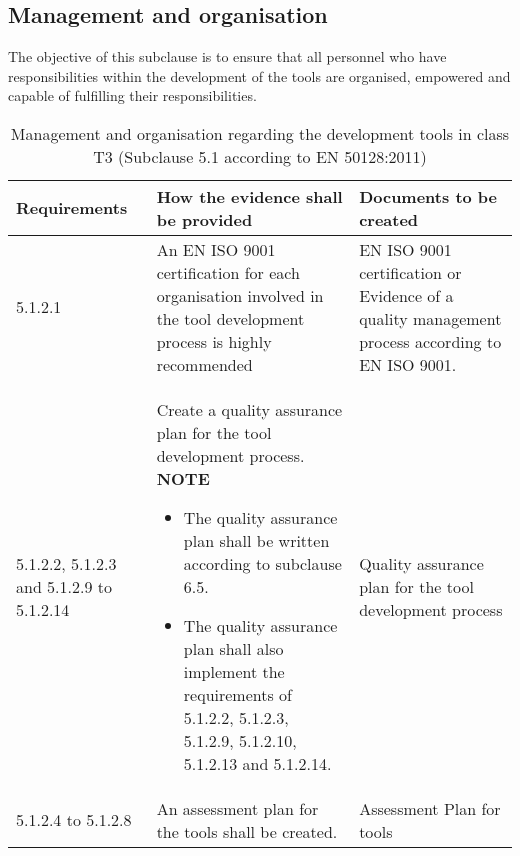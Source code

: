 \documentclass{template/openetcs_report}
\begin{document}
\subsection{Management and organisation}
The objective of this subclause is to ensure that all personnel who have responsibilities within the development of the tools are organised, empowered and capable of fulfilling their responsibilities.
{\footnotesize\sffamily\centering
\begin{longtable}{|p{2cm}|p{9cm}|p{3cm}|}
\caption{Management and organisation regarding the development tools in class T3 (Subclause 5.1 according to EN 50128:2011)}\\
\hline
\bfseries Requirements & \bfseries How the evidence shall be provided & \bfseries Documents to be created\\
\hline
\hline
\endhead
\hline
\endfoot

5.1.2.1 & An EN ISO 9001 certification for each organisation involved in the tool development process is highly recommended & EN ISO 9001 certification or Evidence of a quality management process according to EN ISO 9001.\\ 
\hline
5.1.2.2, 5.1.2.3 and 5.1.2.9 to 5.1.2.14 & Create a quality assurance plan for the tool development process. 
\linebreak
\linebreak
\textbf{NOTE }
\begin{itemize}\itemsep=0pt
  \item The quality assurance plan shall be written according to subclause 6.5.
  \item The quality assurance plan shall also implement the requirements of 5.1.2.2, 5.1.2.3, 5.1.2.9, 5.1.2.10, 5.1.2.13 and 5.1.2.14.
\end{itemize}
& Quality assurance plan for the tool development process\\ 
\hline
5.1.2.4 to 5.1.2.8 & An assessment plan for the tools shall be created. 
& Assessment Plan for tools\\ 
\hline
\end{longtable}}
\end{document}
